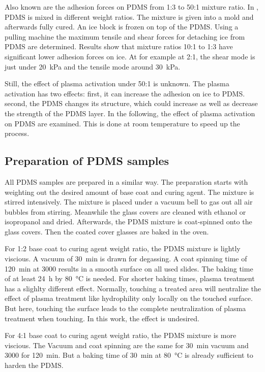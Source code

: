 Also known are the adhesion forces on PDMS from 1:3 to 50:1 mixture ratio. In \cite{IbanezIbanez.2022}, PDMS is mixed in different weight ratios. The mixture is given into a mold and afterwards fully cured. An ice block is frozen on top of the PDMS. Using a pulling machine the maximum tensile and shear forces for detaching ice from PDMS are determined. Results show that mixture ratios 10:1 to 1:3 have significant lower adhesion forces on ice. At for example at 2:1, the shear mode is just under \SI{20}{\kilo\pascal} and the tensile mode around \SI{30}{\kilo\pascal}. 

Still, the effect of plasma activation under 50:1 is unknown. The plasma activation has two effects: first, it can increase the adhesion on ice to PDMS. second, the PDMS changes its structure, which could increase as well as decrease the strength of the PDMS layer. In the following, the effect of plasma activation on PDMS are examined. This is done at room temperature to speed up the process.

\subsection{Preparation of PDMS samples}

All PDMS samples are prepared in a similar way. The preparation starts with weighting out the desired amount of base coat and curing agent. The mixture is stirred intensively. The mixture is placed under a vacuum bell to gas out all air bubbles from stirring. Meanwhile the glass covers are cleaned with ethanol or isopropanol and dried. Afterwards, the PDMS mixture is coat-spinned onto the glass covers. Then the coated cover glasses are baked in the oven.

For 1:2 base coat to curing agent weight ratio, the PDMS mixture is lightly viscious. A vacuum of \SI{30}{\minute} is drawn for degassing. A coat spinning time of \SI{120}{\minute} at \SI{3000}{\rpm} results in a smooth surface on all used slides. The baking time of at least \SI{24}{\hour} by \SI{80}{\degreeCelsius} is needed. For shorter baking times, plasma treatment has a slighlty different effect. Normally, touching a treated area will neutralize the effect of plasma treatment like hydrophility only locally on the touched surface. But here, touching the surface leads to the complete neutralization of plasma treatment when touching. In this work, the effect is undesired.
 
For 4:1 base coat to curing agent weight ratio, the PDMS mixture is more viscious. The Vacuum and coat spinning are the same for \SI{30}{\minute} vacuum and \SI{3000}{\rpm} for \SI{120}{\minute}. But a baking time of \SI{30}{\minute} at \SI{80}{\degreeCelsius} is already sufficient to harden the PDMS. 

